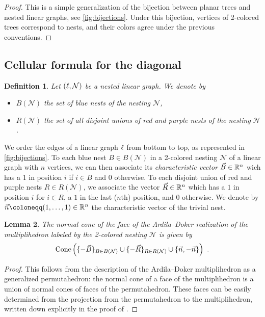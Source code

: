 \documentclass[twoside, 12pt]{amsart}
\newtheorem{definition}{Definition}[section]
\newtheorem{lemma}[definition]{Lemma}
\theoremstyle{remark}
\begin{document}
\begin{proof}
This is a simple generalization of the bijection between planar trees and nested linear graphs, see \cref{fig:bijections}. 
Under this bijection, vertices of 2-colored trees correspond to nests, and their colors agree under the previous conventions. 
\end{proof}



\subsection{Cellular formula for the diagonal} \label{ss:cellular-formula}

\begin{definition}
Let $(\ell,\mathcal{N})$ be a nested linear graph. We denote by 
\begin{itemize}[leftmargin=*]
  \item $B(\mathcal{N})$ the set of blue nests of the nesting $\mathcal{N}$,
  \item $R(\mathcal{N})$ the set of all disjoint \emph{unions} of red and purple nests of the nesting $\mathcal{N}$.
\end{itemize}
\end{definition}

We order the edges of a linear graph $\ell$ from bottom to top, as represented in \cref{fig:bijections}. 
To each blue nest $B \in B(\mathcal{N})$ in a 2-colored nesting $\mathcal{N}$ of a linear graph with $n$ vertices, we can then associate its \emph{characteristic vector} $\vec B\in \mathbb{R}^n$ wich has a $1$ in position $i$ if $i \in B$ and $0$ otherwise.
To each disjoint union of red and purple nests $R \in R(\mathcal{N})$, we associate the vector $\vec R \in \mathbb{R}^n$ which has a $1$ in position $i$ for $i \in R$, a $1$ in the last ($n$th) position, and $0$ otherwise. 
We denote by $\vec n \coloneqq (1,\ldots,1) \in \RR^n$ the characteristic vector of the trivial nest.

\begin{lemma} 
\label{lemma:normalcones}
The normal cone of the face of the Ardila--Doker realization of the multiplihedron labeled by the 2-colored nesting $\mathcal{N}$ is given by \[\operatorname{Cone}\left(\{-\vec B\}_{B \in B(\mathcal{N})} \cup \{-\vec R\}_{R \in R(\mathcal{N})} \cup \{\vec n, - \vec n\} \right) \ . \]
\end{lemma} 

\begin{proof} 
This follows from the description of the Ardila--Doker multiplihedron as a generalized permutahedron: 
the normal cone of a face of the multiplihedron is a union of normal cones of faces of the permutahedron. 
These faces can be easily determined from the projection from the permutahedron to the multiplihedron, written down explicitly in the proof of \cite[Theorem 3.3.6]{Doker11}.
\end{proof}
\end{document}
